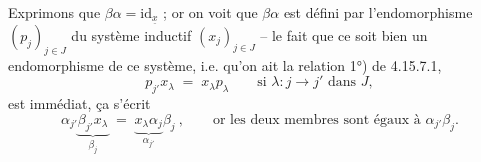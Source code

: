 \documentclass[11pt]{article}
\newcommand{\ux}{\underline{x}}
\newcommand{\id}{\mathrm{id}}
\begin{document}
Exprimons que $\beta\alpha = \id_{\ux}$ ; or on voit que $\beta\alpha$ est défini par l'endomorphisme $(p_j)_{j\in J}$ du système inductif $(x_j)_{j\in J}$ -- le fait que ce soit bien un endomorphisme de ce système, i.e. qu'on ait la relation 1°) de 4.15.7.1,
\[
p_{j'}x_\lambda \;=\; x_\lambda p_\lambda \qquad \text{si } \lambda : j \longrightarrow j' \text{ dans } J, %
\]
est immédiat, ça s'écrit
\[
\alpha_{j'}\underbrace{\beta_{j'}x_\lambda}_{\beta_j} \;=\; \underbrace{x_\lambda\alpha_j}_{\alpha_{j'}}\beta_j\ , \qquad \text{or les deux membres sont égaux à } \alpha_{j'}\beta_j.
\]
\end{document}
